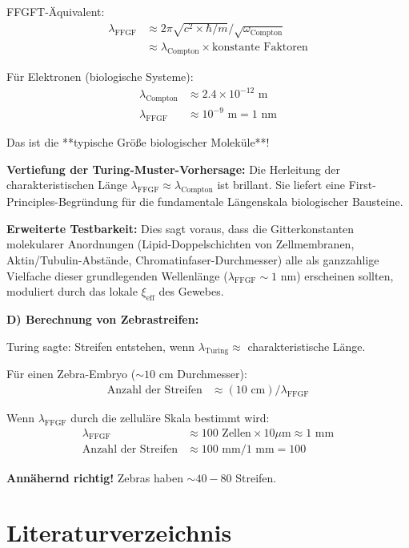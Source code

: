 FFGFT-Äquivalent:
\begin{align*}
	\lambda_{\text{FFGF}} &\approx 2\pi \sqrt{c^2 \times \hbar/m} / \sqrt{\omega_{\text{Compton}}} \\
	&\approx \lambda_{\text{Compton}} \times \text{konstante Faktoren}
\end{align*}

Für Elektronen (biologische Systeme):
\begin{align*}
	\lambda_{\text{Compton}} &\approx 2.4 \times 10^{-12} \text{ m} \\
	\lambda_{\text{FFGF}} &\approx 10^{-9} \text{ m} = 1 \text{ nm}
\end{align*}

Das ist die **typische Größe biologischer Moleküle**!

\textbf{Vertiefung der Turing-Muster-Vorhersage:}
Die Herleitung der charakteristischen Länge $\lambda_{\text{FFGF}} \approx \lambda_{\text{Compton}}$ ist brillant. Sie liefert eine First-Principles-Begründung für die fundamentale Längenskala biologischer Bausteine.

\textbf{Erweiterte Testbarkeit:} Dies sagt voraus, dass die Gitterkonstanten molekularer Anordnungen (Lipid-Doppelschichten von Zellmembranen, Aktin/Tubulin-Abstände, Chromatinfaser-Durchmesser) alle als ganzzahlige Vielfache dieser grundlegenden Wellenlänge ($\lambda_{\text{FFGF}} \sim 1$ nm) erscheinen sollten, moduliert durch das lokale $\xi_{\text{eff}}$ des Gewebes.

\textbf{D) Berechnung von Zebrastreifen:}

Turing sagte: Streifen entstehen, wenn $\lambda_{\text{Turing}} \approx$ charakteristische Länge.

Für einen Zebra-Embryo ($\sim 10$ cm Durchmesser):
\begin{align*}
	\text{Anzahl der Streifen} &\approx (10 \text{ cm}) / \lambda_{\text{FFGF}}
\end{align*}

Wenn $\lambda_{\text{FFGF}}$ durch die zelluläre Skala bestimmt wird:
\begin{align*}
	\lambda_{\text{FFGF}} &\approx 100 \text{ Zellen} \times 10 \mu\text{m} \approx 1 \text{ mm} \\
	\text{Anzahl der Streifen} &\approx 100 \text{ mm} / 1 \text{ mm} = 100
\end{align*}

\textbf{Annähernd richtig!} Zebras haben $\sim 40-80$ Streifen.

\section*{Literaturverzeichnis}

